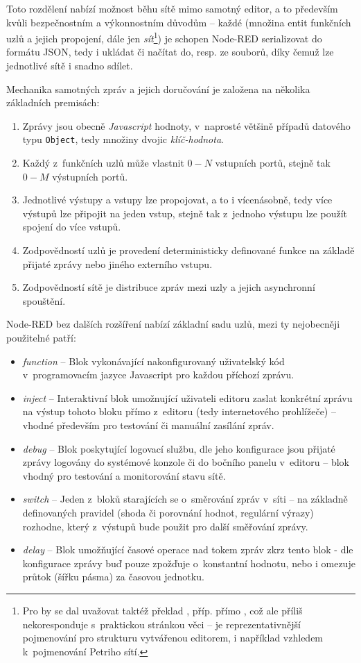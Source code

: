 Toto rozdělení nabízí možnost běhu sítě mimo samotný editor, a to především kvůli bezpečnostním a
výkonnostním důvodům -- každé  (množina entit funkčních uzlů a jejich propojení, dále jen
\emph{sít}\footnote{Pro  by se dal uvažovat taktéž překlad ,
příp. přímo , což ale příliš nekoresponduje s~praktickou stránkou věci --  je reprezentativnější
pojmenování pro strukturu vytvářenou editorem, i například vzhledem k~pojmenování Petriho sítí.}) je schopen
Node-RED serializovat do formátu JSON, tedy i ukládat či načítat do, resp. ze souborů, díky čemuž lze jednotlivé sítě i snadno sdílet.

Mechanika samotných zpráv a jejich doručování je založena na několika základních premisách:
\begin{enumerate}
    \item Zprávy jsou obecně \emph{Javascript} hodnoty, v~naprosté většině případů datového typu \texttt{Object}, tedy množiny dvojic \emph{klíč-hodnota}.
    \item Každý z~funkčních uzlů může vlastnit $0-N$ vstupních portů, stejně tak $0-M$ výstupních portů.
    \item Jednotlivé výstupy a vstupy lze propojovat, a to i vícenásobně, tedy více výstupů lze připojit na jeden vstup,
    stejně tak z~jednoho výstupu lze použít spojení do více vstupů.
    \item Zodpovědností uzlů je provedení deterministicky definované funkce na základě přijaté zprávy nebo
    jiného externího vstupu.
    \item Zodpovědností sítě je distribuce zpráv mezi uzly a jejich asynchronní spouštění.
\end{enumerate}

Node-RED bez dalších rozšíření nabízí základní sadu uzlů, mezi ty nejobecněji použitelné patří:

\begin{itemize}
    \item\emph{function} -- Blok vykonávající nakonfigurovaný uživatelský kód v~programovacím jazyce Javascript pro
    každou příchozí zprávu.
    \item\emph{inject} -- Interaktivní blok umožnující uživateli editoru zaslat konkrétní zprávu na výstup tohoto bloku
    přímo z~editoru (tedy internetového prohlížeče) -- vhodné především pro testování či manuální zasílání zpráv.
    \item\emph{debug} -- Blok poskytující logovací službu, dle jeho konfigurace jsou přijaté zprávy logovány do systémové konzole či do
    bočního panelu v~editoru -- blok vhodný pro testování a monitorování stavu sítě.
    \item\emph{switch} -- Jeden z~bloků starajících se o~směrování zpráv v~síti -- na základně definovaných pravidel
    (shoda či porovnání hodnot, regulární výrazy) rozhodne, který z~výstupů bude použit pro další směřování zprávy.
    \item\emph{delay} -- Blok umožňující časové operace nad tokem zpráv zkrz tento blok - dle konfigurace zprávy buď
    pouze zpožďuje o~konstantní hodnotu, nebo i omezuje průtok (šířku pásma) za časovou jednotku.
\end{itemize}

